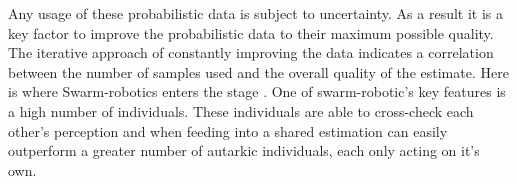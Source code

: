 Any usage of these probabilistic data is subject to uncertainty. As a result it is a key factor to improve the probabilistic data to their maximum possible quality. The iterative approach of constantly improving the data indicates a correlation between the number of samples used and the overall quality of the estimate. Here is where Swarm-robotics enters the stage . One of swarm-robotic's key features is a high number of individuals. These individuals are able to cross-check each other's perception and when feeding into a shared estimation can easily outperform a greater number of autarkic individuals, each only acting on it's own.
